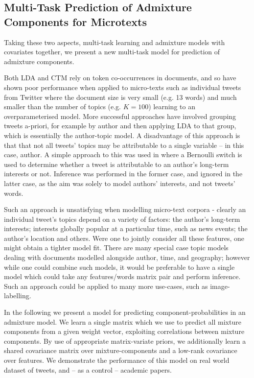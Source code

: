 

\subsection{Multi-Task Prediction of Admixture Components for Microtexts}
Taking these two aspects, multi-task learning and admixture models with covariates together, we present a new multi-task model for prediction of admixture components.

Both LDA and CTM rely on token co-occurrences in documents, and so have shown poor performance when applied to micro-texts such as individual tweets from Twitter\cite{DeLaRosa2011} where the document size is very small (e.g. 13 words) and much smaller than the number of topics (e.g. $K=100$) learning to an overparameterised model. More successful approaches have involved grouping tweets a-priori, for example by author\cite{Weng2010}\cite{Xu2011}\cite{Hong2010}\cite{Eisenstein2010} and then applying LDA to that group, which is essentially the author-topic model\cite{MacCallum2007}. A disadvantage of this approach is that that not all tweets' topics may be attributable to a single variable -- in this case, author. A simple approach to this was used in \cite{Xu2011} where a Bernoulli switch is used to determine whether a tweet is attributable to an author's long-term interests or not. Inference was performed in the former case, and ignored in the latter case, as the aim was solely to model authors' interests, and not tweets' words.

Such an approach is unsatisfying when modelling micro-text corpora - clearly an individual tweet's topics depend on a variety of factors: the author's long-term interests; interests globally popular at a particular time, such as news events; the author's location and others. Were one to jointly consider all these features, one might obtain a tighter model fit. There are many special case topic models dealing with documents modelled alongside author\cite{RosenZvi2004}, time\cite{Wang2006}, and geography\cite{Eisenstein2010}; however while one could combine such models, it would be preferable to have a single model which could take any features/words matrix pair and perform inference. Such an approach could be applied to many more use-cases, such as image-labelling.

In the following we present a model for predicting component-probabilities in an admixture model. We learn a single matrix which we use to predict all mixture components from a given weight vector, exploiting correlations between mixture components. By use of appropriate matrix-variate priors, we additionally learn a shared covariance matrix over mixture-components and a low-rank covariance over features. We demonstrate the performance of this model on real world dataset of tweets, and -- as a control -- academic papers.


